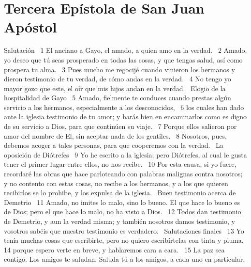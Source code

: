 \chapter{Tercera Epístola de San Juan Apóstol}

Salutación  
1 El anciano a Gayo, el amado, a quien amo en la verdad.  
2 Amado, yo deseo que tú seas prosperado en todas las cosas, y que tengas salud, así como prospera tu alma.  
3 Pues mucho me regocijé cuando vinieron los hermanos y dieron testimonio de tu verdad, de cómo andas en la verdad.  
4 No tengo yo mayor gozo que este, el oír que mis hijos andan en la verdad.  
Elogio de la hospitalidad de Gayo  
5 Amado, fielmente te conduces cuando prestas algún servicio a los hermanos, especialmente a los desconocidos,  
6 los cuales han dado ante la iglesia testimonio de tu amor; y harás bien en encaminarlos como es digno de su servicio a Dios, para que continúen su viaje.  
7 Porque ellos salieron por amor del nombre de El, sin aceptar nada de los gentiles.  
8 Nosotros, pues, debemos acoger a tales personas, para que cooperemos con la verdad.  
La oposición de Diótrefes  
9 Yo he escrito a la iglesia; pero Diótrefes, al cual le gusta tener el primer lugar entre ellos, no nos recibe.  
10 Por esta causa, si yo fuere, recordaré las obras que hace parloteando con palabras malignas contra nosotros; y no contento con estas cosas, no recibe a los hermanos, y a los que quieren recibirlos se lo prohibe, y los expulsa de la iglesia.  
Buen testimonio acerca de Demetrio  
11 Amado, no imites lo malo, sino lo bueno. El que hace lo bueno es de Dios; pero el que hace lo malo, no ha visto a Dios.  
12 Todos dan testimonio de Demetrio, y aun la verdad misma; y también nosotros damos testimonio, y vosotros sabéis que nuestro testimonio es verdadero.  
Salutaciones finales  
13 Yo tenía muchas cosas que escribirte, pero no quiero escribírtelas con tinta y pluma,  
14 porque espero verte en breve, y hablaremos cara a cara.  
15 La paz sea contigo. Los amigos te saludan. Saluda tú a los amigos, a cada uno en particular.